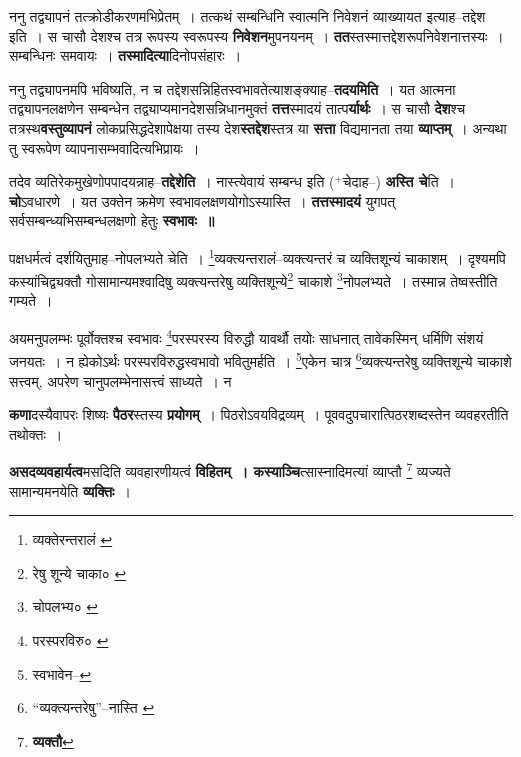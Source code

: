 \documentclass[article,12pt,a4paper]{memoir}
\newcommand{\add}[1]{($^{+}$#1)}
\begin{document}
	  \pstart ननु तद्व्यापनं तत्क्रोडीकरणमभिप्रेतम् । तत्कथं सम्बन्धिनि स्वात्मनि निवेशनं व्याख्यायत इत्याह--तद्देश इति । स चासौ देशश्च तत्र रूपस्य स्वरूपस्य \textbf{निवेशन}मुपनयनम् । \textbf{तत}स्तस्मात्तद्देशरूपनिवेशनात्तस्यः । सम्बन्धिनः समवायः । \textbf{तस्मादित्या}दिनोपसंहारः ।
	\pend
      

	  \pstart ननु तद्व्यापनमपि भविष्यति, न च तद्देशसन्निहितस्वभावतेत्याशङ्क्याह--\textbf{तदयमिति} । यत आत्मना तद्व्यापनलक्षणेन सम्बन्धेन तद्व्याप्यमानदेशसन्निधानमुक्तं \textbf{तत्त}स्मादयं तात्प\textbf{र्यार्थः} । स चासौ \textbf{देश}श्च तत्रस्थ\textbf{वस्तुव्यापनं} लोकप्रसिद्धदेशापेक्षया तस्य देश\textbf{स्तद्देश}स्तत्र या \textbf{सत्ता} विद्यमानता तया \textbf{व्याप्तम्} । अन्यथा तु स्वरूपेण व्यापनासम्भवादित्यभिप्रायः ।
	\pend
      

	  \pstart तदेव व्यतिरेकमुखेणोपपादयन्ना\leavevmode{}ह--\textbf{तद्देशेति} । नास्त्येवायं सम्बन्ध इति \add{चेदाह--} \textbf{अस्ति चे}ति । \textbf{चो}ऽवधारणे । यत उक्तेन क्रमेण स्वभावलक्षणयोगोऽस्यास्ति । \textbf{तत्तस्मादयं} युगपत् सर्वसम्बन्ध्यभिसम्बन्धलक्षणो हेतुः \textbf{स्वभावः ॥}
	\pend
      \leavevmode{}
	  \bigskip
	  \begingroup
	

	  \pstart पक्षधर्मत्वं दर्शयितुमाह--नोपलभ्यते चेति । \footnote{व्यक्तेरन्तरालं \cite{dp-msA} \cite{dp-msB} \cite{dp-edP} \cite{dp-edH}}व्यक्त्यन्तरालं--व्यक्त्यन्तरं च व्यक्तिशून्यं चाकाशम् । दृश्यमपि कस्यांचिद्व्यक्तौ गोसामान्यमश्वादिषु व्यक्त्यन्तरेषु व्यक्तिशून्ये\footnote{रेषु शून्ये चाका० \cite{dp-msA}} चाकाशे \footnote{चोपलभ्य० \cite{dp-msA} \cite{dp-msB} \cite{dp-edP} \cite{dp-edH}}नोपलभ्यते । तस्मान्न तेष्वस्तीति गम्यते ।
	\pend
       

	  \pstart अयमनुपलम्भः पूर्वोक्तश्च स्वभावः \footnote{परस्परविरु० \cite{dp-msA} \cite{dp-msB} \cite{dp-msC} \cite{dp-edP} \cite{dp-edH} \cite{dp-edE} \cite{dp-edN}}परस्परस्य विरुद्धौ यावर्थौ तयोः साधनात् तावेकस्मिन् धर्मिणि संशयं जनयतः । न ह्येकोऽर्थः परस्परविरुद्धस्वभावो भवितुमर्हति । \footnote{स्वभावेन--\cite{dp-msD-n}}एकेन चात्र \footnote{“व्यक्त्यन्तरेषु”--नास्ति \cite{dp-msB}}व्यक्त्यन्तरेषु व्यक्तिशून्ये चाकाशे सत्त्वम्, अपरेण चानुपलम्भेनासत्त्वं साध्यते । न
	\pend
      
	  \endgroup
	

	  \pstart \textbf{कणा}दस्यैवापरः शिष्यः \textbf{पैठर}स्तस्य \textbf{प्रयोगम्} । पिठरोऽवयविद्रव्यम् । पूववदुपचारात्पिठरशब्दस्तेन व्यवहरतीति तथोक्तः ।
	\pend
      

	  \pstart \textbf{असदव्यवहार्यत्व}मसदिति व्यवहारणीयत्वं \textbf{विहितम् । कस्याञ्चि}त्सास्नादिमत्यां व्याप्तौ \footnote{\textbf{व्यक्तौ}} व्यज्यते सामान्यमनयेति \textbf{व्यक्तिः} ।
	\pend
      
\end{document}
